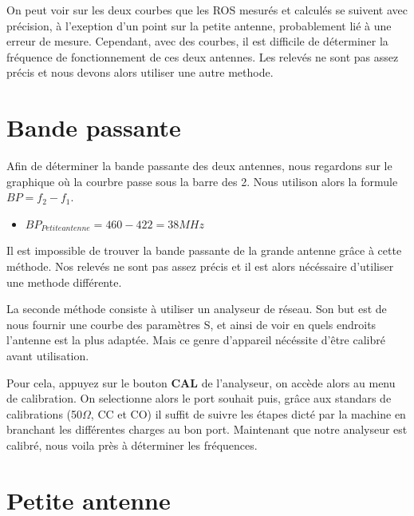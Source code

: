 \documentclass[a4paper,12pt]{report}            %
\begin{document}
On peut voir sur les deux courbes que les ROS mesurés et calculés se suivent avec précision, à l'exeption
d'un point sur la petite antenne, probablement lié à une erreur de mesure. Cependant, avec des courbes, il
est difficile de déterminer la fréquence de fonctionnement de ces deux antennes. Les relevés ne sont pas assez 
précis et nous devons alors utiliser une autre methode.

\section{Bande passante}

Afin de déterminer la bande passante des deux antennes, nous regardons sur le graphique où la courbre passe
sous la barre des 2. Nous utilison alors la formule $BP = f_{2}-f_{1}$.\\
\begin{itemize}
    \item $BP_{Petite antenne} = 460 - 422 = 38 MHz$
\end{itemize}

Il est impossible de trouver la bande passante de la grande antenne grâce à cette méthode. Nos relevés
ne sont pas assez précis et il est alors nécéssaire d'utiliser une methode différente.

La seconde méthode consiste à utiliser un analyseur de réseau. Son but est de nous fournir une courbe des
paramètres S, et ainsi de voir en quels endroits l'antenne est la plus adaptée. Mais ce genre d'appareil nécéssite 
d'être calibré avant utilisation.

Pour cela, appuyez sur le bouton \textbf{CAL} de l'analyseur, on accède alors au menu de calibration. On selectionne
alors le port souhait puis, grâce aux standars de calibrations (50$\Omega$, CC et CO) il suffit de suivre les étapes
dicté par la machine en branchant les différentes charges au bon port. Maintenant que notre analyseur est 
calibré, nous voila près à déterminer les fréquences.

\section{Petite antenne}
\end{document}
